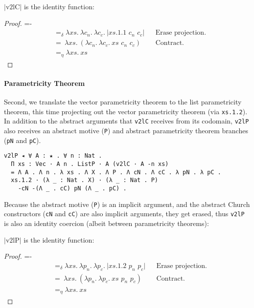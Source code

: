 \documentclass[a4paper,envcountsame,envcountsect]{llncs}
\newcommand{\eqed}[0]{\tag*{\qed}}
\newcommand{\lablem}[1]{\label{lem:#1}}
\newcommand{\earg}[1]{\,\,#1}
\newcommand{\erase}[1]{\ensuremath{\lvert #1 \rvert}}
\newcommand{\fun}[1]{\lambda #1 .~}
\newcommand{\by}[1]{\text{#1}}
\newcommand{\name}[1]{\textrm{#1}}
\begin{document}
\begin{lemma}
\erase{\name{v2lC}} is the identity function:
\lablem{v2lc}
\end{lemma}

\begin{proof}
{\small
\abovedisplayskip=-\baselineskip
\begin{align*}
  &=_\delta \fun{xs} \fun{c_n} \fun{c_c} \erase{
    xs.1.1 \earg c_n \earg c_c
  }
  && \by{Erase projection.}
  \\
  &=~ \fun{xs} (\fun{c_n} \fun{c_c}
    xs \earg c_n \earg c_c)
  && \by{Contract.}
  \\
  &=_\eta \fun{xs}{xs}
  \eqed
\end{align*}}
\end{proof}

\paragraph{Parametricity Theorem}

Second, we translate the vector parametricity theorem to the list
parametricity theorem, this time projecting out the vector
parametricity theorem (via \texttt{xs.1.2}). In addition to the abstract
arguments that \texttt{v2lC} receives from its codomain,
\texttt{v2lP} also receives an abstract motive (\texttt{P}) and
abstract parametricity theorem branches
(\texttt{pN} and \texttt{pC}).

\begin{verbatim}
v2lP ◂ ∀ A : ★ . ∀ n : Nat .
  Π xs : Vec · A n . ListP · A (v2lC · A -n xs)
  = Λ A . Λ n . λ xs . Λ X . Λ P . Λ cN . Λ cC . λ pN . λ pC .
  xs.1.2 · (λ _ : Nat . X) · (λ _ : Nat . P)
    -cN -(Λ _ . cC) pN (Λ _ . pC) .
\end{verbatim}

Because the abstract motive (\texttt{P}) is an implicit argument,
and the abstract Church constructors (\texttt{cN} and \texttt{cC}) are
also implicit arguments, they get erased,
thus \texttt{v2lP} is also an identity coercion
(albeit between parametricity theorems):

\begin{lemma}
\erase{\name{v2lP}} is the identity function:
\lablem{v2lp}
\end{lemma}

\begin{proof}
{\small
\abovedisplayskip=-\baselineskip
\begin{align*}
  &=_\delta \fun{xs} \fun{p_n} \fun{p_c} \erase{
    xs.1.2 \earg p_n \earg p_c
  }
  && \by{Erase projection.}
  \\
  &=~ \fun{xs} (\fun{p_n} \fun{p_c}
    xs \earg p_n \earg p_c)
  && \by{Contract.}
  \\
  &=_\eta \fun{xs}{xs}
  \eqed
\end{align*}}
\end{proof}
\end{document}
